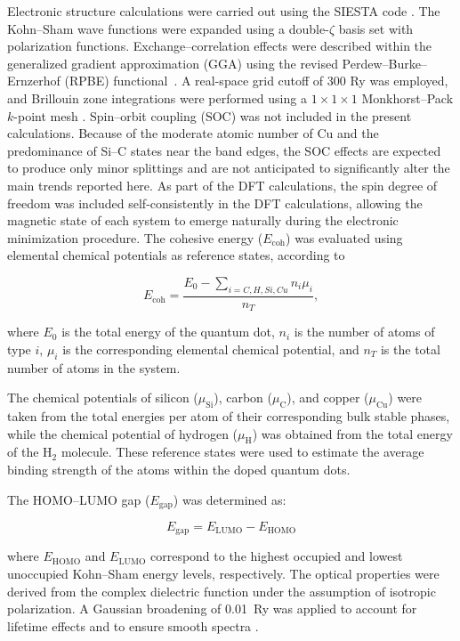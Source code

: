 \documentclass[11pt]{article} %
\begin{document}
Electronic structure calculations were carried out using the \textsc{SIESTA} code \cite{Jose_M_Soler_2002}. The Kohn--Sham wave functions were expanded using a double-$\zeta$ basis set with polarization functions. Exchange--correlation effects were described within the generalized gradient approximation (GGA) using the revised Perdew--Burke--Ernzerhof (RPBE) functional~\cite{PhysRevB.59.7413}. A real-space grid cutoff of 300 Ry was employed, and Brillouin zone integrations were performed using a $1 \times 1 \times 1$ Monkhorst--Pack $k$-point mesh \cite{PhysRevB.13.5188}.
Spin--orbit coupling (SOC) was not included in the present calculations. Because of the moderate atomic number of Cu and the predominance of Si--C states near the band edges, the SOC effects are expected to produce only minor splittings and are not anticipated to significantly alter the main trends reported here. As part of the DFT calculations, the spin degree of freedom was included self-consistently in the DFT calculations, allowing the magnetic state of each system to emerge naturally during the electronic minimization procedure.
The cohesive energy ($E_{\mathrm{coh}}$) was evaluated using elemental chemical potentials as reference states, according to \cite{Amogh_Vig}

\begin{equation}
	E_{\mathrm{coh}} = \frac{E_0 - \sum_{i = C,H,Si,Cu} n_i \mu_i}{n_T},
\end{equation}

where $E_0$ is the total energy of the quantum dot, $n_i$ is the number of atoms of type $i$, $\mu_i$ is the corresponding elemental chemical potential, and $n_T$ is the total number of atoms in the system.

The chemical potentials of silicon ($\mu_{\mathrm{Si}}$), carbon ($\mu_{\mathrm{C}}$), and copper ($\mu_{\mathrm{Cu}}$) were taken from the total energies per atom of their corresponding bulk stable phases, while the chemical potential of hydrogen ($\mu_{\mathrm{H}}$) was obtained from the total energy of the H$_2$ molecule. These reference states were used to estimate the average binding strength of the atoms within the doped quantum dots.

The HOMO--LUMO gap ($E_{\mathrm{gap}}$) was determined as:

\begin{equation}
	E_{\mathrm{gap}} = E_{\mathrm{LUMO}} - E_{\mathrm{HOMO}}
\end{equation}

where $E_{\mathrm{HOMO}}$ and $E_{\mathrm{LUMO}}$ correspond to the highest occupied and lowest unoccupied Kohn--Sham energy levels, respectively.
The optical properties were derived from the complex dielectric function under the assumption of isotropic polarization. A Gaussian broadening of 0.01~Ry was applied to account for lifetime effects and to ensure smooth spectra \cite{PhysRevB.73.045112}.
\end{document}
